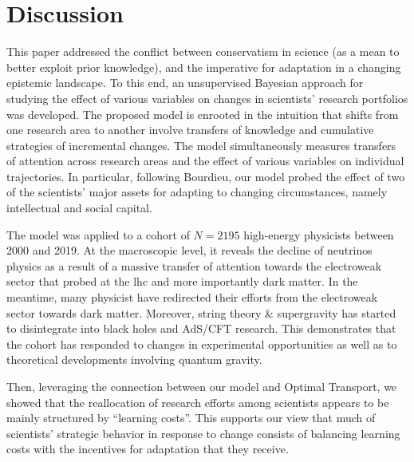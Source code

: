 \documentclass{article}
\begin{document}


\section{Discussion}

This paper addressed the conflict between conservatism in science (as a mean to better exploit prior knowledge), and the imperative for adaptation in a changing epistemic landscape. To this end, an unsupervised Bayesian approach for studying the effect of various variables on changes in scientists' research portfolios was developed. The proposed model is enrooted in the intuition that shifts from one research area to another involve transfers of knowledge and cumulative strategies of incremental changes. The model simultaneously measures transfers of attention across research areas and the effect of various variables on individual trajectories. In particular, following Bourdieu, our model probed the effect of two of the scientists' major assets for adapting to changing circumstances, namely intellectual and social capital.






The model was applied to a cohort of $N=2195$ high-energy physicists between 2000 and 2019. At the macroscopic level, it reveals the decline of neutrinos physics as a result of a massive transfer of attention towards the electroweak sector that probed at the \gls{lhc} and more importantly dark matter. In the meantime, many physicist have redirected their efforts from the electroweak sector towards dark matter. Moreover, string theory \& supergravity has started to disintegrate into black holes and AdS/CFT research. This demonstrates that the cohort has responded to changes in experimental opportunities as well as to theoretical developments involving quantum gravity.

Then, leveraging the connection between our model and Optimal Transport, we showed that the reallocation of research efforts among scientists appears to be mainly structured by ``learning costs''. This supports our view that much of scientists' strategic behavior in response to change consists of balancing learning costs with the incentives for adaptation that they receive.
\end{document}
